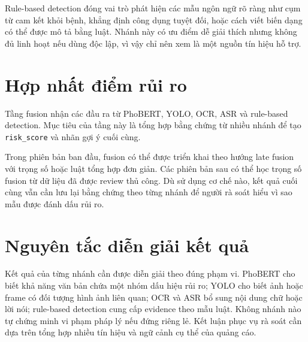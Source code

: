 Rule-based detection đóng vai trò phát hiện các mẫu ngôn ngữ rõ ràng như cụm từ cam kết khỏi bệnh, khẳng định công dụng tuyệt đối, hoặc cách viết biến dạng có thể được mô tả bằng luật. Nhánh này có ưu điểm dễ giải thích nhưng không đủ linh hoạt nếu dùng độc lập, vì vậy chỉ nên xem là một nguồn tín hiệu hỗ trợ.

\section{Hợp nhất điểm rủi ro}
Tầng fusion nhận các đầu ra từ PhoBERT, YOLO, OCR, ASR và rule-based detection. Mục tiêu của tầng này là tổng hợp bằng chứng từ nhiều nhánh để tạo \texttt{risk\_score} và nhãn gợi ý cuối cùng.

Trong phiên bản ban đầu, fusion có thể được triển khai theo hướng late fusion với trọng số hoặc luật tổng hợp đơn giản. Các phiên bản sau có thể học trọng số fusion từ dữ liệu đã được review thủ công. Dù sử dụng cơ chế nào, kết quả cuối cùng vẫn cần lưu lại bằng chứng theo từng nhánh để người rà soát hiểu vì sao mẫu được đánh dấu rủi ro.

\section{Nguyên tắc diễn giải kết quả}
Kết quả của từng nhánh cần được diễn giải theo đúng phạm vi. PhoBERT cho biết khả năng văn bản chứa một nhóm dấu hiệu rủi ro; YOLO cho biết ảnh hoặc frame có đối tượng hình ảnh liên quan; OCR và ASR bổ sung nội dung chữ hoặc lời nói; rule-based detection cung cấp evidence theo mẫu luật. Không nhánh nào tự chứng minh vi phạm pháp lý nếu đứng riêng lẻ. Kết luận phục vụ rà soát cần dựa trên tổng hợp nhiều tín hiệu và ngữ cảnh cụ thể của quảng cáo.
